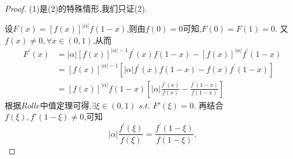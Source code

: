\documentclass[lang=cn,newtx,10pt,scheme=chinese]{elegantbook}
\begin{document}
\begin{proof}
    (1)是(2)的特殊情形,我们只证(2).

    设$F\left( x \right) =\left[ f\left( x \right) \right] ^{\left| \alpha \right|}f\left( 1-x \right)$,则由$f(0)=0$可知,$F(0)=F(1)=0$.
    又$f(x)\ne0,\forall x\in(0,1)$,从而
    \begin{equation}
        \begin{split}
            F^{\prime}\left( x \right) &=\left| \alpha \right|\left[ f\left( x \right) \right] ^{\left| \alpha \right|-1}f^{\prime}(x)f(1-x)-\left[ f\left( x \right) \right] ^{\left| \alpha \right|}f^{\prime}(1-x)
\\
&=\left[ f\left( x \right) \right] ^{\left| \alpha \right|-1}\left[ \left| \alpha \right|f^{\prime}(x)f(1-x)-f(x)f^{\prime}(1-x) \right]
\\
&=\left[ f\left( x \right) \right] ^{\left| \alpha \right|}f(1-x)\left[ \left| \alpha \right|\frac{f^{\prime}(x)}{f(x)}-\frac{f^{\prime}(1-x)}{f(1-x)} \right]        
\end{split}
        \nonumber
    \end{equation}
    根据$Rolle$中值定理可得,$\exists \xi \in (0,1)\,\,s.t.\,\,F'\left( \xi \right) =0$.
    再结合$f(\xi),f'(1-\xi)\ne0$,可知
    \begin{equation}
        \vert\alpha\vert\frac{f^{\prime}(\xi)}{f(\xi)}=\frac{f^{\prime}(1-\xi)}{f(1-\xi)}.
        \nonumber
    \end{equation}
\end{proof}
\end{document}
